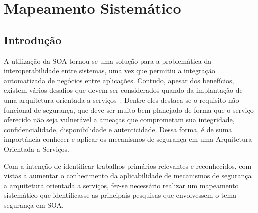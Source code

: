 \chapter{Mapeamento Sistemático}
\section{Introdução}



A utilização da SOA tornou-se uma solução para a problemática da interoperabilidade entre sistemas, uma vez que permitiu a integração automatizada de negócios entre aplicações. Contudo, apesar dos benefícios, existem vários desafios que devem ser considerados quando da implantação de uma arquitetura orientada a serviços~\cite{marks2006}. Dentre eles destaca-se o requisito não funcional de segurança, que deve ser muito bem planejado de forma que o serviço oferecido não seja vulnerável a ameaças que comprometam sua integridade, confidencialidade, disponibilidade e autenticidade. Dessa forma, é de suma importância conhecer e aplicar os mecanismos de segurança em uma Arquitetura Orientada a Serviços.

Com a intenção de identificar trabalhos primários relevantes e reconhecidos, com vistas a aumentar o conhecimento da aplicabilidade de mecanismos de segurança a arquitetura orientada a serviços, fez-se necessário realizar um mapeamento sistemático que identificasse as principais pesquisas que envolvessem o tema segurança em SOA.


